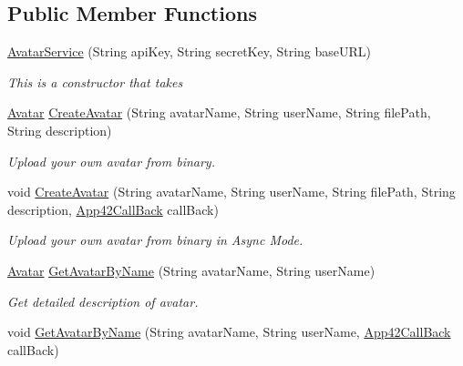 \subsection*{Public Member Functions}
\begin{DoxyCompactItemize}
\item 
\hyperlink{classcom_1_1shephertz_1_1app42_1_1paas_1_1sdk_1_1csharp_1_1avatar_1_1_avatar_service_ac9f081cff1c034300c4d600c96bd0029}{Avatar\+Service} (String api\+Key, String secret\+Key, String base\+U\+R\+L)
\begin{DoxyCompactList}\small\item\em This is a constructor that takes \end{DoxyCompactList}\item 
\hyperlink{classcom_1_1shephertz_1_1app42_1_1paas_1_1sdk_1_1csharp_1_1avatar_1_1_avatar}{Avatar} \hyperlink{classcom_1_1shephertz_1_1app42_1_1paas_1_1sdk_1_1csharp_1_1avatar_1_1_avatar_service_af3e678f74bfb9454e6a4b0d9fe40e90a}{Create\+Avatar} (String avatar\+Name, String user\+Name, String file\+Path, String description)
\begin{DoxyCompactList}\small\item\em Upload your own avatar from binary. \end{DoxyCompactList}\item 
void \hyperlink{classcom_1_1shephertz_1_1app42_1_1paas_1_1sdk_1_1csharp_1_1avatar_1_1_avatar_service_a8a44f81842d5a1e69cdc9836d058bf14}{Create\+Avatar} (String avatar\+Name, String user\+Name, String file\+Path, String description, \hyperlink{interfacecom_1_1shephertz_1_1app42_1_1paas_1_1sdk_1_1csharp_1_1_app42_call_back}{App42\+Call\+Back} call\+Back)
\begin{DoxyCompactList}\small\item\em Upload your own avatar from binary in Async Mode. \end{DoxyCompactList}\item 
\hyperlink{classcom_1_1shephertz_1_1app42_1_1paas_1_1sdk_1_1csharp_1_1avatar_1_1_avatar}{Avatar} \hyperlink{classcom_1_1shephertz_1_1app42_1_1paas_1_1sdk_1_1csharp_1_1avatar_1_1_avatar_service_adce34d5afe74171777e63128a9fc0692}{Get\+Avatar\+By\+Name} (String avatar\+Name, String user\+Name)
\begin{DoxyCompactList}\small\item\em Get detailed description of avatar. \end{DoxyCompactList}\item 
void \hyperlink{classcom_1_1shephertz_1_1app42_1_1paas_1_1sdk_1_1csharp_1_1avatar_1_1_avatar_service_a4a46f346d4c74eaa403e725600308849}{Get\+Avatar\+By\+Name} (String avatar\+Name, String user\+Name, \hyperlink{interfacecom_1_1shephertz_1_1app42_1_1paas_1_1sdk_1_1csharp_1_1_app42_call_back}{App42\+Call\+Back} call\+Back)

\end{DoxyCompactItemize}
